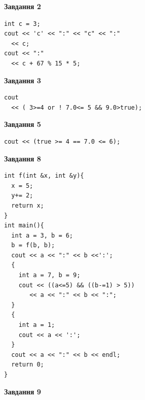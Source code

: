 \documentclass[12pt, ukrainian]{article}
\begin{document}
{\begin {large}
\begin{minipage}[t]{7.0cm}
\end{minipage}
\vline \hspace{1mm}
\begin{minipage}[t]{11.0cm}

\begin{center}
\textbf{Завдання 2}
\end{center}
\vspace{-8mm}

\begin{verbatim}
int c = 3;
cout << 'c' << ":" << "c" << ":" 
  << c;
cout << ":" 
  << c + 67 % 15 * 5;
\end{verbatim}



\begin{center}
\textbf{Завдання 3}
\end{center}
\vspace{-8mm}

\begin{verbatim}
cout 
  << ( 3>=4 or ! 7.0<= 5 && 9.0>true);
\end{verbatim}



\begin{center}
\textbf{Завдання 5}
\end{center}
\vspace{-8mm}

\begin{verbatim}
cout << (true >= 4 == 7.0 <= 6);
\end{verbatim}



\begin{center}
\textbf{Завдання 8}
\end{center}
\vspace{-8mm}

\begin{verbatim}
int f(int &x, int &y){
  x = 5;
  y+= 2;
  return x;
}
int main(){
  int a = 3, b = 6;
  b = f(b, b);
  cout << a << ":" << b <<':';
  {
    int a = 7, b = 9;
    cout << ((a<=5) && ((b-=1) > 5))
       << a << ":" << b << ":";
  }
  {
    int a = 1;
    cout << a << ':';
  }
  cout << a << ":" << b << endl;
  return 0;
}
\end{verbatim}

\end{minipage}


\begin{minipage}[t]{7.0cm}

\begin{center}
\textbf{Завдання 9}
\end{center}
\vspace{-8mm}


\end{minipage}
\end{large}}
\end{document}
